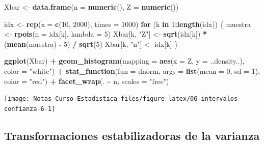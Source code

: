 \documentclass[
  12pt,
]{book}
\newenvironment{Shaded}{\begin{snugshade}}{\end{snugshade}}
\newcommand{\ControlFlowTok}[1]{\textcolor[rgb]{0.13,0.29,0.53}{\textbf{#1}}}
\newcommand{\DataTypeTok}[1]{\textcolor[rgb]{0.13,0.29,0.53}{#1}}
\newcommand{\DecValTok}[1]{\textcolor[rgb]{0.00,0.00,0.81}{#1}}
\newcommand{\KeywordTok}[1]{\textcolor[rgb]{0.13,0.29,0.53}{\textbf{#1}}}
\newcommand{\NormalTok}[1]{#1}
\newcommand{\OperatorTok}[1]{\textcolor[rgb]{0.81,0.36,0.00}{\textbf{#1}}}
\newcommand{\StringTok}[1]{\textcolor[rgb]{0.31,0.60,0.02}{#1}}
\begin{document}
\begin{Shaded}
\begin{Highlighting}[]
\NormalTok{Xbar \textless{}{-}}\StringTok{ }\KeywordTok{data.frame}\NormalTok{(}\DataTypeTok{n =} \KeywordTok{numeric}\NormalTok{(), }\DataTypeTok{Z =} \KeywordTok{numeric}\NormalTok{())}

\NormalTok{idx \textless{}{-}}\StringTok{ }\KeywordTok{rep}\NormalTok{(}\DataTypeTok{x =} \KeywordTok{c}\NormalTok{(}\DecValTok{10}\NormalTok{, }\DecValTok{2000}\NormalTok{), }\DataTypeTok{times =} \DecValTok{1000}\NormalTok{)}
\ControlFlowTok{for}\NormalTok{ (k }\ControlFlowTok{in} \DecValTok{1}\OperatorTok{:}\KeywordTok{length}\NormalTok{(idx)) \{}
\NormalTok{  muestra \textless{}{-}}\StringTok{ }\KeywordTok{rpois}\NormalTok{(}\DataTypeTok{n =}\NormalTok{ idx[k], }\DataTypeTok{lambda =} \DecValTok{5}\NormalTok{)}
\NormalTok{  Xbar[k, }\StringTok{"Z"}\NormalTok{] \textless{}{-}}\StringTok{ }\KeywordTok{sqrt}\NormalTok{(idx[k]) }\OperatorTok{*}\StringTok{ }\NormalTok{(}\KeywordTok{mean}\NormalTok{(muestra) }\OperatorTok{{-}}\StringTok{ }\DecValTok{5}\NormalTok{) }\OperatorTok{/}\StringTok{ }\KeywordTok{sqrt}\NormalTok{(}\DecValTok{5}\NormalTok{)}
\NormalTok{  Xbar[k, }\StringTok{"n"}\NormalTok{] \textless{}{-}}\StringTok{ }\NormalTok{idx[k]}
\NormalTok{\}}



\KeywordTok{ggplot}\NormalTok{(Xbar) }\OperatorTok{+}
\StringTok{  }\KeywordTok{geom\_histogram}\NormalTok{(}\DataTypeTok{mapping =} \KeywordTok{aes}\NormalTok{(}\DataTypeTok{x =}\NormalTok{ Z, }\DataTypeTok{y =}\NormalTok{ ..density..), }\DataTypeTok{color =} \StringTok{"white"}\NormalTok{) }\OperatorTok{+}
\StringTok{  }\KeywordTok{stat\_function}\NormalTok{(}\DataTypeTok{fun =}\NormalTok{ dnorm, }\DataTypeTok{args =} \KeywordTok{list}\NormalTok{(}\DataTypeTok{mean =} \DecValTok{0}\NormalTok{, }\DataTypeTok{sd =} \DecValTok{1}\NormalTok{), }\DataTypeTok{color =} \StringTok{"red"}\NormalTok{) }\OperatorTok{+}
\StringTok{  }\KeywordTok{facet\_wrap}\NormalTok{(. }\OperatorTok{\textasciitilde{}}\StringTok{ }\NormalTok{n, }\DataTypeTok{scales =} \StringTok{"free"}\NormalTok{)}
\end{Highlighting}
\end{Shaded}

\begin{center}\texttt{[image: Notas-Curso-Estadistica\_files/figure-latex/06-intervalos-confianza-6-1]} \end{center}

\hypertarget{transformaciones-estabilizadoras-de-la-varianza}{%
\subsection{Transformaciones estabilizadoras de la varianza}\label{transformaciones-estabilizadoras-de-la-varianza}}
\end{document}
